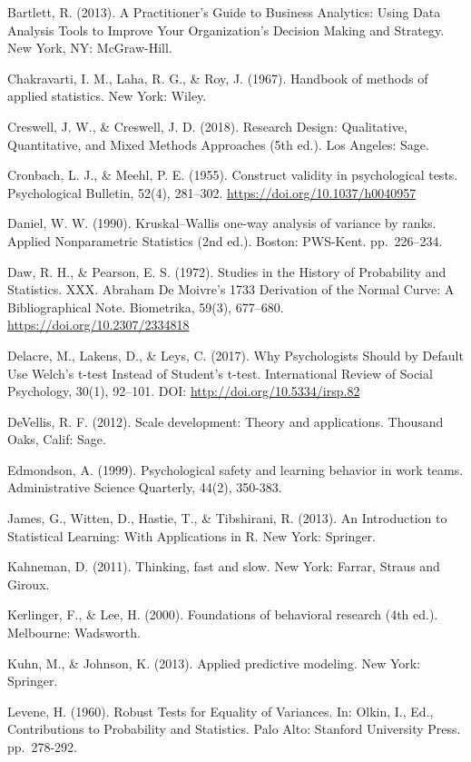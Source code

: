 \documentclass[]{book}
\begin{document}
Bartlett, R. (2013). A Practitioner's Guide to Business Analytics: Using Data Analysis Tools to Improve Your Organization's Decision Making and Strategy. New York, NY: McGraw-Hill.

Chakravarti, I. M., Laha, R. G., \& Roy, J. (1967). Handbook of methods of applied statistics. New York: Wiley.

Creswell, J. W., \& Creswell, J. D. (2018). Research Design: Qualitative, Quantitative, and Mixed Methods Approaches (5th ed.). Los Angeles: Sage.

Cronbach, L. J., \& Meehl, P. E. (1955). Construct validity in psychological tests. Psychological Bulletin, 52(4), 281--302. \url{https://doi.org/10.1037/h0040957}

Daniel, W. W. (1990). Kruskal--Wallis one-way analysis of variance by ranks. Applied Nonparametric Statistics (2nd ed.). Boston: PWS-Kent. pp.~226--234.

Daw, R. H., \& Pearson, E. S. (1972). Studies in the History of Probability and Statistics. XXX. Abraham De Moivre's 1733 Derivation of the Normal Curve: A Bibliographical Note. Biometrika, 59(3), 677--680. \url{https://doi.org/10.2307/2334818}

Delacre, M., Lakens, D., \& Leys, C. (2017). Why Psychologists Should by Default Use Welch's t-test Instead of Student's t-test. International Review of Social Psychology, 30(1), 92--101. DOI: \url{http://doi.org/10.5334/irsp.82}

DeVellis, R. F. (2012). Scale development: Theory and applications. Thousand Oaks, Calif: Sage.

Edmondson, A. (1999). Psychological safety and learning behavior in work teams. Administrative Science Quarterly, 44(2), 350-383.

James, G., Witten, D., Hastie, T., \& Tibshirani, R. (2013). An Introduction to Statistical Learning: With Applications in R. New York: Springer.

Kahneman, D. (2011). Thinking, fast and slow. New York: Farrar, Straus and Giroux.

Kerlinger, F., \& Lee, H. (2000). Foundations of behavioral research (4th ed.). Melbourne: Wadsworth.

Kuhn, M., \& Johnson, K. (2013). Applied predictive modeling. New York: Springer.

Levene, H. (1960). Robust Tests for Equality of Variances. In: Olkin, I., Ed., Contributions to Probability and Statistics. Palo Alto: Stanford University Press. pp.~278-292.
\end{document}
